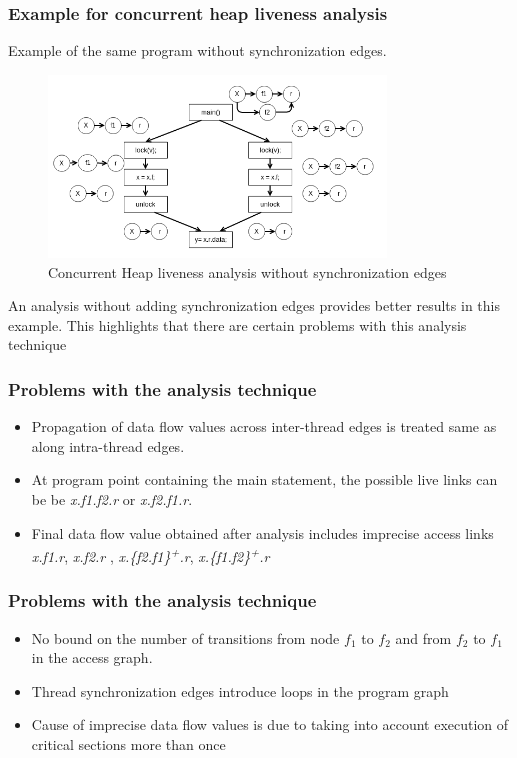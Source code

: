 \documentclass{beamer}
\begin{document}
\begin{frame}
	\frametitle{Example for concurrent heap liveness analysis}
	Example of the same program without synchronization edges.
	\begin{figure}
		\centering
		\includegraphics[width=0.8\textwidth]{Figures/conc_analysis_incorrect.png}
		\caption{Concurrent Heap liveness analysis without synchronization edges}
		\label{fig:nullpointeranalysis}
	\end{figure}
	An analysis without adding synchronization edges provides better results in this example. This highlights that there are certain problems with this analysis technique
\end{frame}

\begin{frame}
	\frametitle{Problems with the analysis technique}
	\begin{itemize}
		\item Propagation of
		data flow values across inter-thread edges  is treated same as along intra-thread edges.
		\item At program point containing the main statement, the possible live links can be be \emph{x.f1.f2.r} or \emph{x.f2.f1.r}.
		\item  Final data flow value  obtained after analysis includes imprecise access links \emph{x.f1.r}, \emph{x.f2.r} , \emph {x.\{f2.f1\}\textsuperscript{+}.r}, \emph{x.\{f1.f2\}\textsuperscript{+}.r} 
		
	\end{itemize}
\end{frame}

\begin{frame}
	\frametitle{Problems with the analysis technique}
	\begin{itemize}
		\item No bound on the number of transitions from node $f_1$ to $f_2$ and from $f_2$ to $f_1$ in the access graph.
		\item Thread synchronization edges introduce loops in the program graph
		\item Cause of imprecise data flow values is due to taking into account execution of critical sections more than once
	\end{itemize}
\end{frame}
\end{document}
